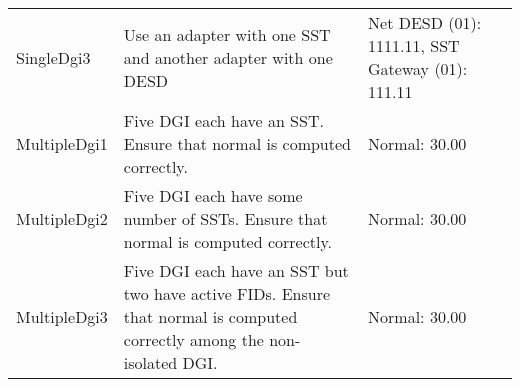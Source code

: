 \documentclass{article}
\begin{document}
\begin{center}
\begin{footnotesize}
\begin{longtable}{|p{3cm}|p{4cm}|p{10cm}|c|}
    SingleDgi3 & Use an adapter with one SST and another adapter with one DESD & Net DESD (01): 1111.11, SST Gateway (01): 111.11 & \\
    MultipleDgi1 & Five DGI each have an SST. Ensure that normal is computed correctly. & Normal: 30.00 & \\
    MultipleDgi2 & Five DGI each have some number of SSTs. Ensure that normal is computed correctly. & Normal: 30.00 & \\
    MultipleDgi3 & Five DGI each have an SST but two have active FIDs. Ensure that normal is computed correctly among the non-isolated DGI. & Normal: 30.00 & \\
\end{longtable}
\end{footnotesize}
\end{center}
\end{document}
